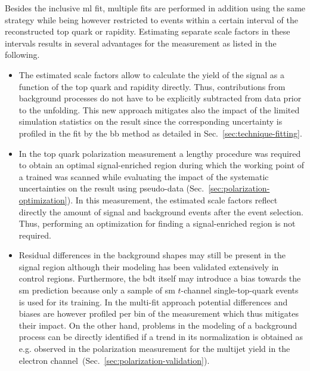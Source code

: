 

Besides the inclusive \gls{ml} fit, multiple fits are performed in addition using the same strategy while being however restricted to events within a certain interval of the reconstructed top quark \pt or rapidity. Estimating separate scale factors in these intervals results in several advantages for the measurement as listed in the following.

\begin{itemize}
\item The estimated scale factors allow to calculate the yield of the signal as a function of the top quark \pt and rapidity directly. Thus, contributions from background processes do not have to be explicitly subtracted from data prior to the unfolding. This new approach mitigates also the impact of the limited simulation statistics on the result since the corresponding uncertainty is profiled in the fit by the \acrlong{bb} method as detailed in Sec.~\ref{sec:technique-fitting}.

\item In the top quark polarization measurement a lengthy procedure was required to obtain an optimal signal-enriched region during which the working point of a 
trained \bdt was scanned while evaluating the impact of the systematic uncertainties on the result using pseudo-data (Sec.~\ref{sec:polarization-optimization}). In this measurement, the estimated scale factors reflect directly the amount of signal and background events after the event selection. Thus, performing an optimization for finding a signal-enriched region is not required.

\item Residual differences in the background shapes may still be present in the signal region although their modeling has been validated extensively in control regions. Furthermore, the \gls{bdt} itself may introduce a bias towards the \gls{sm} prediction because only a sample of \gls{sm} $t$-channel single-top-quark events is used for its training. In the multi-fit approach potential differences and biases are however profiled per bin of the measurement which thus mitigates their impact. On the other hand, problems in the modeling of a background process can be directly identified if a trend in its normalization is obtained as e.g. observed in the polarization measurement for the multijet yield in the electron channel~(Sec.~\ref{sec:polarization-validation}).
\end{itemize}


